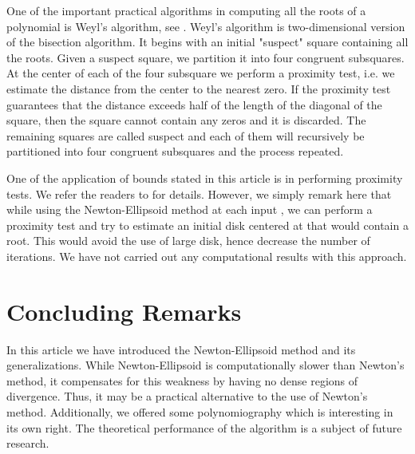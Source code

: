 \documentclass{article}
\begin{document}
One of the important practical algorithms in computing all the roots of a polynomial is Weyl's algorithm, see \cite{pan97}.  Weyl's algorithm is two-dimensional version of the bisection algorithm. It begins with an
initial "suspect" square containing all the roots. Given a suspect square, we
partition it into four congruent subsquares. At the center of each of the
four subsquare we perform a proximity test, i.e. we estimate the distance
from the center to the nearest zero. If the proximity test guarantees that
the distance exceeds half of the length of the diagonal of the square, then the square cannot contain any zeros and it is discarded. The remaining
squares are called suspect and each of them will recursively be partitioned into four congruent subsquares and the process repeated.

One of the application of bounds stated in this article is in performing proximity tests. We refer the readers to \cite{kalbook} for details. However, we simply remark here that while using the Newton-Ellipsoid method at each input , we can perform a proximity test and try to estimate an initial disk centered at  that would contain a root.  This would avoid the use of large disk, hence decrease the number of iterations. We have not carried out any computational results with this approach.

\section{Concluding Remarks}
In this article we have introduced the Newton-Ellipsoid method and its generalizations.  While Newton-Ellipsoid is computationally slower than Newton's method, it compensates for this weakness by having no dense regions of divergence. Thus, it may be a practical alternative to the use of Newton's method.  Additionally, we offered some polynomiography which is interesting in its own right. The theoretical performance of the algorithm is a subject of future research.
\end{document}
